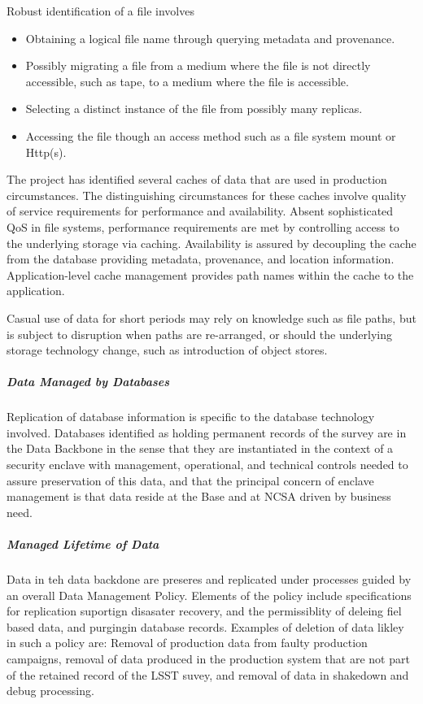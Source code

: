 Robust identification of a file involves
\begin{itemize}
\item Obtaining a logical file name through querying metadata and provenance.
\item Possibly migrating a file from a medium where the file is not directly accessible,
such as tape, to a medium where the file is accessible.
\item Selecting a distinct instance of the file from possibly many replicas.
\item Accessing the file though an access method such as a file system mount or Http(s).
\end{itemize}

The project has identified several caches of data that are used in production circumstances.
The distinguishing circumstances for these caches involve quality of service requirements for
performance and availability. Absent sophisticated QoS in file systems, performance requirements
are met by controlling access to the underlying storage via caching. Availability is assured by
decoupling the cache from the database providing metadata, provenance, and location information.
Application-level cache management provides path names within the cache to the application.

Casual use of data for short periods may rely on knowledge such as file paths, but is subject
to disruption when paths are re-arranged, or should the underlying storage technology change,
such as introduction of object stores.


\subparagraph{Data Managed by Databases}

Replication of database information is specific to the database technology involved.
Databases identified as holding permanent records of the survey are in the Data Backbone
in the sense that they are instantiated in the context of a security enclave with management,
operational, and technical controls needed to assure preservation of this data, and that the
principal concern of enclave management is that data reside at the Base and at NCSA
driven by business need.

\subparagraph{Managed Lifetime of Data}
Data in teh data backdone are preseres and replicated under processes
guided by an overall Data Management Policy.  Elements of the policy
include specifications for replication suportign disasater recovery,
and the permissiblity of deleing fiel based data, and purgingin
database records.  Examples of deletion of data likley in such a
policy are: Removal of production data from faulty production campaigns,
removal of data produced in the production system that are not part
of the retained record of the LSST suvey, and removal of data in
shakedown and debug processing.

